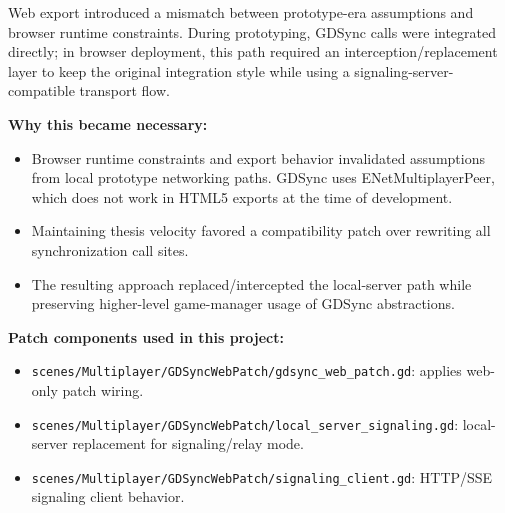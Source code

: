 Web export introduced a mismatch between prototype-era assumptions and browser runtime constraints. During prototyping, GDSync calls were integrated directly; in browser deployment, this path required an interception/replacement layer to keep the original integration style while using a signaling-server-compatible transport flow.


\textbf{Why this became necessary:}
\begin{itemize}
    \item Browser runtime constraints and export behavior invalidated assumptions from local prototype networking paths.  GDSync uses ENetMultiplayerPeer, which does not work in HTML5 exports at the time of development.
    \item Maintaining thesis velocity favored a compatibility patch over rewriting all synchronization call sites.
    \item The resulting approach replaced/intercepted the local-server path while preserving higher-level game-manager usage of GDSync abstractions.
\end{itemize}

\textbf{Patch components used in this project:}
\begin{itemize}
    \item \texttt{scenes/Multiplayer/GDSyncWebPatch/gdsync\_web\_patch.gd}: applies web-only patch wiring.
    \item \texttt{scenes/Multiplayer/GDSyncWebPatch/local\_server\_signaling.gd}: local-server replacement for signaling/relay mode.
    \item \texttt{scenes/Multiplayer/GDSyncWebPatch/signaling\_client.gd}: HTTP/SSE signaling client behavior.
\end{itemize}

